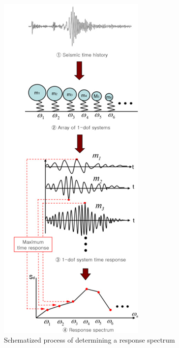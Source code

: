 \documentclass[9pt]{extarticle}
\begin{document}
\begin{figure}[H]
\begin{minipage}{0.6\textwidth}
\end{minipage}
\hspace{10mm}
\begin{minipage}{0.3\textwidth}
    \centering
    \includegraphics[width=\textwidth]{response_spectrum_schematic.png}
    \caption{ Schematized process of determining a response spectrum }
    \label{fig_response_spectrum_schematic}
\end{minipage}
\end{figure}
\end{document}
